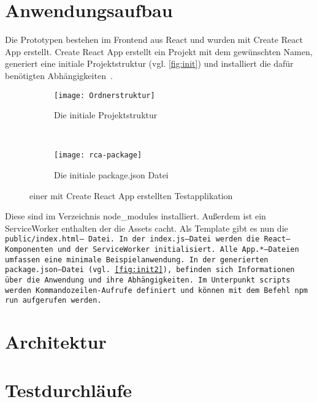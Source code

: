 \section{\label{chap:aufbau}Anwendungsaufbau}
Die Prototypen bestehen im Frontend aus React und wurden mit Create React App erstellt. Create React App erstellt ein Projekt mit dem gewünschten Namen, generiert eine initiale Projektstruktur (vgl. \autoref{fig:init}) und installiert die dafür benötigten Abhängigkeiten~\cite{create-react}.
\begin{figure}[H]
  \centering
  \begin{subfigure}[t]{0.4\textwidth}
          \texttt{[image: Ordnerstruktur]}
          \caption{Die initiale Projektstruktur}
          \label{fig:init}
  \end{subfigure}
  ~
  \begin{subfigure}[t]{0.4\textwidth}
          \texttt{[image: rca-package]}
          \caption{Die initiale package.json Datei}
          \label{fig:init2}
  \end{subfigure}
  \grayRule
  \caption[Create React App: initiale Testapplikation]{einer mit Create React App erstellten Testapplikation}
  \label{fig:create-react-app}
\end{figure}
%
Diese sind im Verzeichnis node\_modules installiert.
Außerdem ist ein ServiceWorker enthalten der die \gls{Assets} cacht.
Als Template gibt es nun die \tt{public/index.html}-- Datei. In der \tt{index.js}--Datei werden die React--Komponenten und der ServiceWorker initialisiert.
Alle \tt{App.*}--Dateien umfassen eine minimale Beispielanwendung.
In der generierten \tt{package.json}--Datei (vgl. \autoref{fig:init2}), befinden sich Informationen über die Anwendung und ihre Abhängigkeiten. Im Unterpunkt \tt{scripts} werden Kommandozeilen-Aufrufe definiert und können mit dem Befehl \tt{npm run} aufgerufen werden.
%
%

%
%
%
\section{Architektur}

%
%

%
%

%
%

%
%
\section{\label{chap:konzept:test}Testdurchläufe}

